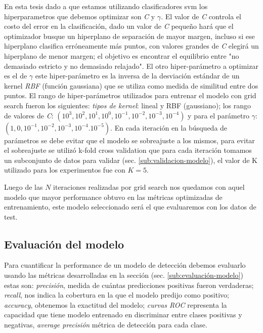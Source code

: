 En esta tesis dado a que estamos utilizando clasificadores \ac{svm} los hiperparametros que debemos optimizar son \textit{C} y $\gamma$. El valor de \textit{C} controla el costo del error en la clasificación, dado un valor de \textit{C} pequeño hará que el optimizador busque un hiperplano de separación de mayor margen, incluso si ese hiperplano clasifica erróneamente más puntos, con valores grandes de \textit{C} elegirá un hiperplano de menor margen; el objetivo es encontrar el equilibrio entre "no demasiado estricto y no demasiado relajado". El otro hiper-parámetro a  optimizar es el de  $\gamma$ este hiper-parámetro es la inversa de la desviación estándar de un kernel \textit{RBF} (función gaussiana) que se utiliza como medida de similitud entre dos puntos. El rango de hiper-parámetros utilizados para entrenar el modelo con grid search fueron los siguientes: \textit{tipos de kernel}: lineal y RBF (gaussiano); los rango de valores de \textit{C}: $(10^{3}, 10^{2}, 10^{1}, 10^{0}, 10^{-1},10^{-2}, 10^{-3}, 10^{-4})$
    y para el parámetro $\gamma$: $(1,0,10^{-1}, 10^{-2},10^{-3},10^{-4}. 10^{-5})$. En cada iteración en la búsqueda de parámetros se debe evitar que el modelo se sobreajuste a los mismos, para evitar el sobreajuste se utilizó k-fold cross validation que para cada iteración tomamos un subconjunto de datos para validar (sec. \ref{sub:validacion-modelo}), el valor de K utilizado para los experimentos fue con $K = 5$.

Luego de las $N$ iteraciones realizadas por grid search nos quedamos con aquel modelo que mayor performance obtuvo en las métricas optimizadas de entrenamiento, este modelo seleccionado será el que evaluaremos con los datos de test.


\subsection*{Evaluación del modelo}\label{sub:evaluacion_class}

Para cuantificar la performance de un modelo de detección debemos evaluarlo usando las métricas desarrolladas en la sección (sec. \ref{sub:evaluación-modelo}) estas son: \textit{precisión}, medida de cuántas predicciones positivas fueron verdaderas; \textit{recall}, nos indica la cobertura en la que el modelo predijo como positivo; \textit{accuracy}, obtenemos la exactitud del modelo; \textit{curvas ROC} representa la capacidad que tiene modelo entrenado en discriminar entre clases positivas y negativas, \textit{average precisión} métrica de detección para cada clase.

